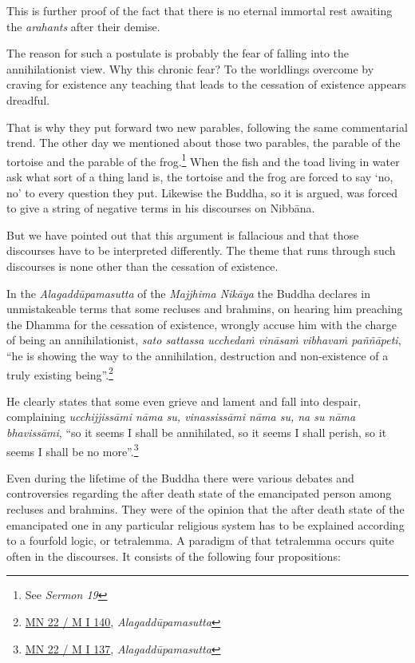 This is further proof of the fact that there is no eternal immortal rest awaiting the \emph{arahants} after their demise.

The reason for such a postulate is probably the fear of falling into the annihilationist view. Why this chronic fear? To the worldlings overcome by craving for existence any teaching that leads to the cessation of existence appears dreadful.

That is why they put forward two new parables, following the same commentarial trend. The other day we mentioned about those two parables, the parable of the tortoise and the parable of the frog.\footnote{See \emph{Sermon 19}} When the fish and the toad living in water ask what sort of a thing land is, the tortoise and the frog are forced to say `no, no' to every question they put. Likewise the Buddha, so it is argued, was forced to give a string of negative terms in his discourses on Nibbāna.

But we have pointed out that this argument is fallacious and that those discourses have to be interpreted differently. The theme that runs through such discourses is none other than the cessation of existence.

In the \emph{Alagaddūpamasutta} of the \emph{Majjhima Nikāya} the Buddha declares in unmistakeable terms that some recluses and brahmins, on hearing him preaching the Dhamma for the cessation of existence, wrongly accuse him with the charge of being an annihilationist, \emph{sato sattassa ucchedaṁ vināsaṁ vibhavaṁ paññāpeti}, ``he is showing the way to the annihilation, destruction and non-existence of a truly existing being''.\footnote{\href{https://suttacentral.net/mn22/pli/ms}{MN 22 / M I 140}, \emph{Alagaddūpamasutta}}

He clearly states that some even grieve and lament and fall into despair, complaining \emph{ucchijjissāmi nāma su, vinassissāmi nāma su, na su nāma bhavissāmi}, ``so it seems I shall be annihilated, so it seems I shall perish, so it seems I shall be no more''.\footnote{\href{https://suttacentral.net/mn22/pli/ms}{MN 22 / M I 137}, \emph{Alagaddūpamasutta}}

Even during the lifetime of the Buddha there were various debates and controversies regarding the after death state of the emancipated person among recluses and brahmins. They were of the opinion that the after death state of the emancipated one in any particular religious system has to be explained according to a fourfold logic, or tetralemma. A paradigm of that tetralemma occurs quite often in the discourses. It consists of the following four propositions:

